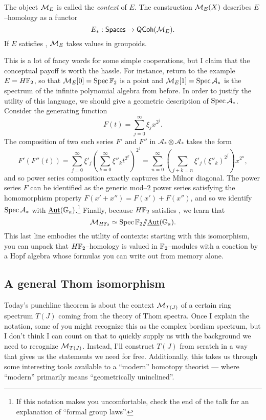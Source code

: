 \begin{definition}
The object $\mathcal{M}_E$ is called the \textit{context} of $E$.  The construction $\mathcal{M}_E(X)$ describes $E$--homology as a functor \[E_*: \mathsf{Spaces} \to \mathsf{QCoh}(\mathcal{M}_E).\]  If $E$ satisfies \FH, $\mathcal{M}_E$ takes values in groupoids.
\end{definition}

This is a lot of fancy words for some simple cooperations, but I claim that the conceptual payoff is worth the hassle.  For instance, return to the example $E = H\mathbb F_2$, so that $\mathcal{M}_E[0] = \operatorname{Spec} \mathbb F_2$ is a point and $\mathcal{M}_E[1] = \operatorname{Spec} \mathcal A_*$ is the spectrum of the infinite polynomial algebra from before.  In order to justify the utility of this language, we should give a geometric description of $\operatorname{Spec} \mathcal A_*$.  Consider the generating function \[F(t) = \sum_{j=0}^\infty \xi_j x^{2^j}.\]  The composition of two such series $F'$ and $F''$ in $\mathcal A_* \otimes \mathcal A_*$ takes the form \[F'(F''(t)) = \sum_{j=0}^\infty \xi'_j \left(\sum_{k=0}^\infty \xi''_k t^{2^k} \right)^{2^j} = \sum_{n=0}^\infty \left( \sum_{j+k=n} \xi'_j (\xi''_k)^{2^j} \right) x^{2^n},\] and so power series composition exactly captures the Milnor diagonal.  The power series $F$ can be identified as the generic mod--$2$ power series satisfying the homomorphism property $F(x' + x'') = F(x') + F(x'')$, and so we identify $\operatorname{Spec} \mathcal A_*$ with $\underline{\operatorname{Aut}}(\mathbb G_a)$.\footnote{If this notation makes you uncomfortable, check the end of the talk for an explanation of ``formal group laws''.}  Finally, because $H\mathbb F_2$ satisfies \FH, we learn that \[\mathcal{M}_{H\mathbb F_2} \simeq \operatorname{Spec} \mathbb F_2 /\!\!/ \underline{\operatorname{Aut}}(\mathbb G_a).\]  This last line embodies the utility of contexts: starting with this isomorphism, you can unpack that $H\mathbb F_2$--homology is valued in $\mathbb F_2$--modules with a coaction by a Hopf algebra whose formulas you can write out from memory alone.




\subsection{A general Thom isomorphism}

Today's punchline theorem is about the context $\mathcal{M}_{T(J)}$ of a certain ring spectrum $T(J)$ coming from the theory of Thom spectra.  Once I explain the notation, some of you might recognize this as the complex bordism spectrum, but I don't think I can count on that to quickly supply us with the background we need to recognize $\mathcal{M}_{T(J)}$.  Instead, I'll construct $T(J)$ from scratch in a way that gives us the statements we need for free.  Additionally, this takes us through some interesting tools available to a ``modern'' homotopy theorist --- where ``modern'' primarily means ``geometrically uninclined''.

